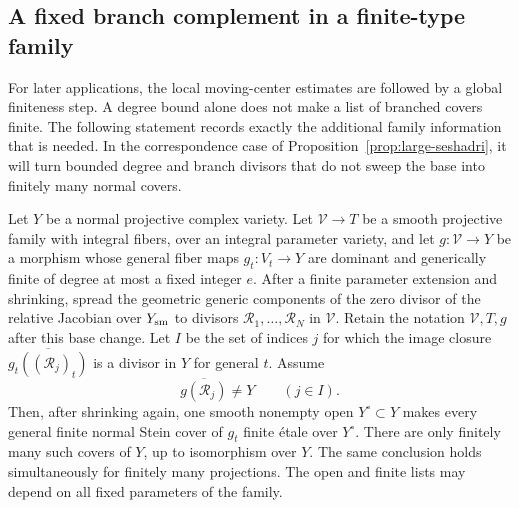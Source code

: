 \subsection{A fixed branch complement in a finite-type family}

For later applications, the local moving-center estimates are
followed by a global finiteness step. A degree bound alone does
not make a list of branched covers finite. The following statement
records exactly the additional family information that is needed.
In the correspondence case of Proposition~\ref{prop:large-seshadri},
it will turn bounded degree and branch divisors that do not sweep
the base into finitely many normal covers.

\begin{lemma}
\label{common:finite-covers}
Let $Y$ be a normal projective complex variety. Let
$\mathcal V\to T$ be a smooth projective family with integral
fibers, over an integral parameter variety, and let
$g:\mathcal V\to Y$ be a morphism whose general fiber maps
$g_t:V_t\to Y$ are dominant and generically finite of degree
at most a fixed integer $e$.
After a finite parameter extension and shrinking, spread the
geometric generic components of the zero divisor of the relative
Jacobian over $Y_{\rm sm}$ to divisors
$\mathcal R_1,\ldots,\mathcal R_N$ in $\mathcal V$.
Retain the notation $\mathcal V,T,g$ after this base change.
Let $I$ be the set of indices $j$ for which the image closure
$\overline{g_t((\mathcal R_j)_t)}$ is a divisor in $Y$ for general $t$.
Assume
\[
 \overline{g(\mathcal R_j)}\ne Y\qquad(j\in I).
\]
Then, after shrinking again, one smooth nonempty open
$Y^\circ\subset Y$ makes every general finite normal Stein cover
of $g_t$ finite \'etale over $Y^\circ$. There are only finitely
many such covers of $Y$, up to isomorphism over $Y$.
The same conclusion holds simultaneously for finitely many
projections. The open and finite lists may depend on all fixed
parameters of the family.
\end{lemma}

